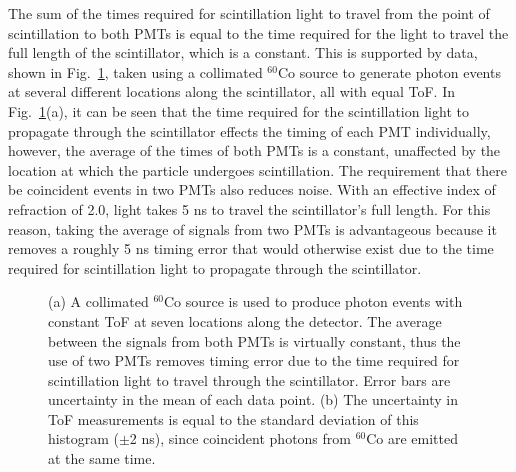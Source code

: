 The sum of the times required for scintillation light to travel from the point of scintillation to both PMTs is equal to the time required for the light to travel the full length of the scintillator, which is a constant.
This is supported by data, shown in Fig.~\ref{fig:ConstPMTAvg}, taken using a collimated $^{60}$Co source to generate photon events at several different locations along the scintillator, all with equal ToF.
In Fig.~\ref{fig:ConstPMTAvg}(a), it can be seen that the time required for the scintillation light to propagate through the scintillator effects the timing of each PMT individually, however, the average of the times of both PMTs is a constant, unaffected by the location at which the particle undergoes scintillation.
The requirement that there be coincident events in two PMTs also reduces noise.
With an effective index of refraction of 2.0, light takes 5 ns to travel the scintillator's full length.
For this reason, taking the average of signals from two PMTs is advantageous because it removes a roughly 5 ns timing error that would otherwise exist due to the time required for scintillation light to propagate through the scintillator.
\begin{figure}[h]
\centering
\hbox{\hspace{3.25em}}

\caption{(a) A collimated $^{60}$Co source is used to produce photon events with constant ToF at seven locations along the detector.
The average between the signals from both PMTs is virtually constant, thus the use of two PMTs removes timing error due to the time required for scintillation light to travel through the scintillator.
Error bars are uncertainty in the mean of each data point.
(b) The uncertainty in ToF measurements is equal to the standard deviation of this histogram ($\pm$2 ns), since coincident photons from $^{60}$Co are emitted at the same time.}
\label{fig:ConstPMTAvg}
\end{figure}

